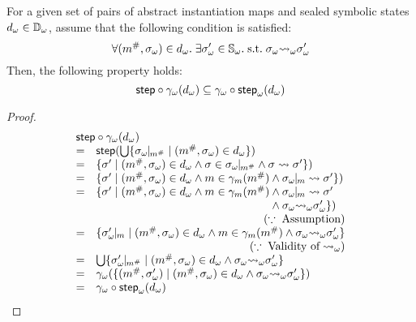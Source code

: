 \begin{lemma}\label{lemma:step-symb}
  For a given set of pairs of abstract instantiation maps and sealed symbolic
  states ${{d}_\omega} \in {\mathbb{D}}_\omega$, assume that the following condition is
  satisfied:
  \[
    \forall ({m}^{\#}, {\sigma}_\omega) \in {{d}_\omega}. \; \exists {\sigma}_\omega' \in
    {\mathbb{S}}_\omega. \; \text{s.t.} \; {\sigma}_\omega {\leadsto}_\omega {\sigma}_\omega'
  \]
  Then, the following property holds:
  \[
    \textsf{step} \circ {\gamma}_\omega({{d}_\omega}) \subseteq
    {\gamma}_\omega \circ {\textsf{step}}_\omega({{d}_\omega})\\
  \]
\end{lemma}
\begin{proof}
  \[
    \begin{array}{cl}
      \multicolumn{2}{l}{\step \circ \symbgamma(\symbelem)}\\
      =& \step(\bigcup \{ \instant{\symbst}{\absimap} \mid (\absimap, \symbst) \in
      \symbelem\})\\
      =& \{ \st' \mid (\absimap, \symbst) \in \symbelem \wedge \st \in
      \instant{\symbst}{\absimap} \wedge \st \trans \st'\})\\
      =& \{ \st' \mid (\absimap, \symbst) \in \symbelem \wedge \imap \in
      \imapgamma(\absimap) \wedge \instant{\symbst}{\imap} \trans \st'\})\\
      =& \{ \st' \mid (\absimap, \symbst) \in \symbelem \wedge \imap \in
      \imapgamma(\absimap) \wedge \instant{\symbst}{\imap} \trans \st'\\
       & \phantom{\{ \st' \mid (\absimap, \symbst) \in \symbelem \wedge \imap \in
      \imapgamma(\absimap)} \wedge \symbst \symbtrans \symbst' \})\\
      & \multicolumn{1}{r}{(\because \; \text{Assumption})}\\
      =& \{ \instant{\symbst'}{\imap} \mid (\absimap, \symbst)
      \in \symbelem \wedge \imap \in \imapgamma(\absimap) \wedge \symbst
      \symbtrans \symbst'\}\\
      & \multicolumn{1}{r}{(\because \; \text{Validity of} \; \symbtrans)}\\
      =& \bigcup \{ \instant{\symbst'}{\absimap} \mid (\absimap, \symbst)
      \in \symbelem \wedge \symbst \symbtrans \symbst' \}\\
      =& \symbgamma(\{ (\absimap, \symbst') \mid (\absimap, \symbst)
      \in \symbelem \wedge \symbst \symbtrans \symbst' \})\\
      =& \symbgamma \circ \symbstep(\symbelem)\\
    \end{array}
  \]
\end{proof}

